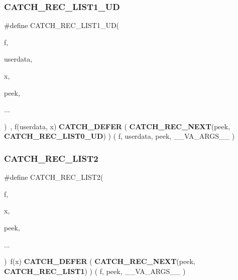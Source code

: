 \mbox{\label{catch_8hpp_abbcff29ced4d413bc121f7b761558c16}} 
\subsubsection{CATCH\_REC\_LIST1\_UD}
{\footnotesize\ttfamily \#define C\+A\+T\+C\+H\+\_\+\+R\+E\+C\+\_\+\+L\+I\+S\+T1\+\_\+\+UD(\begin{DoxyParamCaption}\item[{}]{f,  }\item[{}]{userdata,  }\item[{}]{x,  }\item[{}]{peek,  }\item[{}]{... }\end{DoxyParamCaption})~, f(userdata, x) \textbf{ C\+A\+T\+C\+H\+\_\+\+D\+E\+F\+ER} ( \textbf{ C\+A\+T\+C\+H\+\_\+\+R\+E\+C\+\_\+\+N\+E\+XT}(peek, \textbf{ C\+A\+T\+C\+H\+\_\+\+R\+E\+C\+\_\+\+L\+I\+S\+T0\+\_\+\+UD}) ) ( f, userdata, peek, \+\_\+\+\_\+\+V\+A\+\_\+\+A\+R\+G\+S\+\_\+\+\_\+ )}

\mbox{\label{catch_8hpp_abe3c205d4ba8406d45439abb91366ce9}} 
\subsubsection{CATCH\_REC\_LIST2}
{\footnotesize\ttfamily \#define C\+A\+T\+C\+H\+\_\+\+R\+E\+C\+\_\+\+L\+I\+S\+T2(\begin{DoxyParamCaption}\item[{}]{f,  }\item[{}]{x,  }\item[{}]{peek,  }\item[{}]{... }\end{DoxyParamCaption})~f(x) \textbf{ C\+A\+T\+C\+H\+\_\+\+D\+E\+F\+ER} ( \textbf{ C\+A\+T\+C\+H\+\_\+\+R\+E\+C\+\_\+\+N\+E\+XT}(peek, \textbf{ C\+A\+T\+C\+H\+\_\+\+R\+E\+C\+\_\+\+L\+I\+S\+T1}) ) ( f, peek, \+\_\+\+\_\+\+V\+A\+\_\+\+A\+R\+G\+S\+\_\+\+\_\+ )}

\mbox{\label{catch_8hpp_a0c2dd548d178fbc2202ecd74ce4be91b}} 
